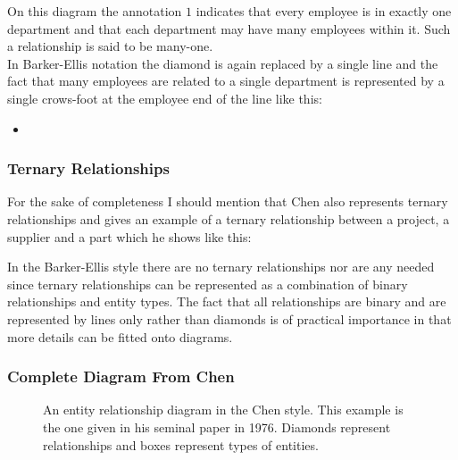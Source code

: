 \noindent On this diagram the annotation $1$ indicates that every employee is in exactly one department and that each department may have many employees within it. Such a relationship is said to be 
many-one. \\

\noindent In Barker-Ellis notation the diamond is again replaced by a single line and the fact that many employees are related to a single department is represented by a single crows-foot at the employee end of the line like this:
\begin{center}

\begin{itemize}
	\item 
\end{itemize}
\end{center}

\subsubsection*{Ternary Relationships}
For the sake of completeness I should mention that Chen also represents ternary relationships and gives an 
example of a ternary relationship between a project, a supplier and a part which he shows like this:
\begin{center}

\end{center}

In the Barker-Ellis style there are no ternary relationships nor are any needed since ternary relationships can be represented as a combination of binary relationships and entity types. The fact that all relationships are binary and are represented by lines only rather than diamonds  is of practical importance in that more details can be fitted onto diagrams.

\subsubsection*{Complete Diagram From Chen}
\begin{figure}
\begin{center}

\end{center}
\caption{
An entity relationship diagram in the Chen style. This example is the one given in his seminal paper in 1976.
Diamonds represent relationships and boxes represent types of entities.
}
\end{figure}